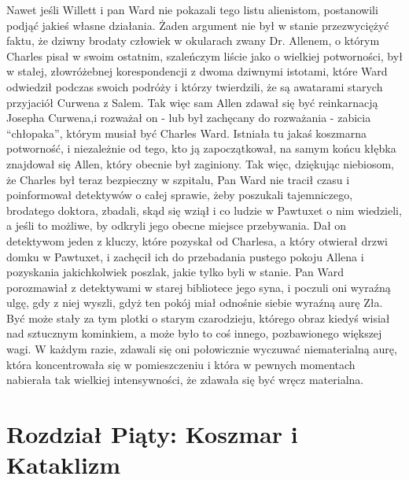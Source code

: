 Nawet jeśli Willett i pan Ward nie pokazali tego listu alienistom, postanowili podjąć jakieś własne działania. Żaden argument nie był w stanie przezwyciężyć faktu, że dziwny brodaty człowiek w okularach zwany Dr. Allenem, o którym Charles pisał w swoim ostatnim, szaleńczym liście jako o wielkiej potworności, był w stałej, złowróżebnej korespondencji z dwoma dziwnymi istotami, które Ward odwiedził podczas swoich podróży i którzy twierdzili, że są awatarami starych przyjaciół Curwena z Salem.  Tak więc sam Allen zdawał się być reinkarnacją Josepha Curwena,i rozważał on - lub był zachęcany do rozważania - zabicia ``chłopaka'', którym musiał być Charles Ward. Istniała tu jakaś koszmarna potworność, i niezależnie od tego, kto ją zapoczątkował, na samym końcu kłębka znajdował się Allen, który obecnie był zaginiony. Tak więc, dziękując niebiosom, że Charles był teraz bezpieczny w szpitalu, Pan Ward nie tracił czasu i poinformował detektywów o całej sprawie, żeby poszukali tajemniczego, brodatego doktora, zbadali, skąd się wziął i co ludzie w Pawtuxet o nim wiedzieli, a jeśli to możliwe, by odkryli jego obecne miejsce przebywania. Dał on detektywom jeden z kluczy, które pozyskał od Charlesa, a który otwierał drzwi domku w Pawtuxet, i zachęcił ich do przebadania pustego pokoju Allena i pozyskania jakichkolwiek poszlak, jakie tylko byli w stanie. Pan Ward porozmawiał z detektywami w starej bibliotece jego syna, i poczuli oni wyraźną ulgę, gdy z niej wyszli, gdyż ten pokój miał odnośnie siebie wyraźną aurę Zła. Być może stały za tym plotki o starym czarodzieju, którego obraz kiedyś wisiał nad sztucznym kominkiem, a może było to coś innego, pozbawionego większej wagi. W każdym razie, zdawali się oni połowicznie wyczuwać niematerialną aurę, która koncentrowała się w pomieszczeniu i która w pewnych momentach nabierała tak wielkiej intensywności, że zdawała się być wręcz materialna.  

\section{Rozdział Piąty: Koszmar i Kataklizm}

